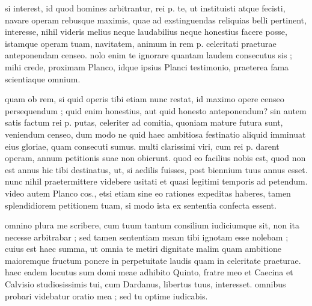 


 si interest, id quod homines arbitrantur, rei p. te, ut instituisti atque fecisti, navare operam rebusque maximis, quae ad exstinguendas reliquias belli pertinent, interesse, nihil videris melius neque laudabilius neque honestius facere posse, istamque operam tuam, navitatem, animum in rem p. celeritati praeturae anteponendam censeo. nolo enim te ignorare quantam laudem consecutus sis ; mihi crede, proximam Planco, idque ipsius Planci testimonio, praeterea fama scientiaque omnium.

 quam ob rem, si quid operis tibi etiam nunc restat, id maximo opere censeo persequendum ; quid enim honestius, aut quid honesto anteponendum? sin autem satis factum rei p. putas, celeriter ad comitia, quoniam mature futura sunt, veniendum censeo, dum modo ne quid haec ambitiosa festinatio aliquid imminuat eius gloriae, quam consecuti sumus. multi clarissimi viri, cum rei p. darent operam, annum petitionis suae non obierunt. quod eo facilius nobis est, quod non est annus hic tibi destinatus, ut, si aedilis fuisses, post biennium tuus annus esset. nunc nihil praetermittere videbere usitati et quasi legitimi temporis ad petendum. video autem Planco cos., etsi etiam sine eo rationes expeditas haberes, tamen splendidiorem petitionem tuam, si modo ista ex sententia confecta essent.

 omnino plura me scribere, cum tuum tantum consilium iudiciumque sit, non ita necesse arbitrabar ; sed tamen sententiam meam tibi ignotam esse nolebam ; cuius est haec summa, ut omnia te metiri dignitate malim quam ambitione maioremque fructum ponere in perpetuitate laudis quam in celeritate praeturae. haec eadem locutus sum domi meae adhibito Quinto, fratre meo et Caecina et Calvisio studiosissimis tui, cum Dardanus, libertus tuus, interesset. omnibus probari videbatur oratio mea ; sed tu optime iudicabis.

